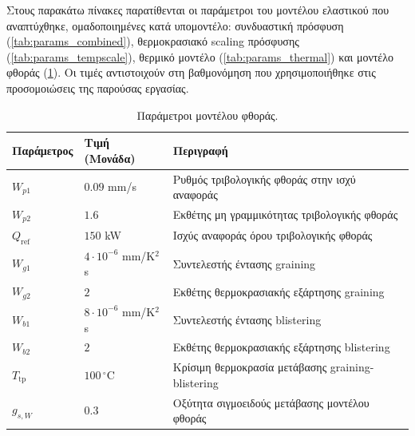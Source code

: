 
Στους παρακάτω πίνακες παρατίθενται οι παράμετροι του μοντέλου ελαστικού που
αναπτύχθηκε, ομαδοποιημένες κατά υπομοντέλο: συνδυαστική πρόσφυση
(\cref{tab:params_combined}), θερμοκρασιακό scaling πρόσφυσης
(\cref{tab:params_tempscale}), θερμικό μοντέλο (\cref{tab:params_thermal}) και
μοντέλο φθοράς (\cref{tab:params_wear}). Οι τιμές αντιστοιχούν στη βαθμονόμηση
που χρησιμοποιήθηκε στις προσομοιώσεις της παρούσας εργασίας.





\begin{table}[htbp]
    \centering
    \small
    \renewcommand{\arraystretch}{1.2}
    \begin{tabular}{@{}l l l@{}}
        \toprule
        \textbf{Παράμετρος} & \textbf{Τιμή (Μονάδα)} & \textbf{Περιγραφή} \\
        \midrule
        $W_{p1}$             & $0.09$ mm/s                 & Ρυθμός τριβολογικής φθοράς στην ισχύ αναφοράς \\
        $W_{p2}$             & $1.6$                       & Εκθέτης μη γραμμικότητας τριβολογικής φθοράς \\
        $Q_{\mathrm{ref}}$   & $150$ kW                    & Ισχύς αναφοράς όρου τριβολογικής φθοράς \\
        $W_{g1}$             & $4 \cdot 10^{-6}$ mm/K$^2$s & Συντελεστής έντασης graining \\
        $W_{g2}$             & $2$                         & Εκθέτης θερμοκρασιακής εξάρτησης graining \\
        $W_{b1}$             & $8 \cdot 10^{-6}$ mm/K$^2$s & Συντελεστής έντασης blistering \\
        $W_{b2}$             & $2$                         & Εκθέτης θερμοκρασιακής εξάρτησης blistering \\
        $T_{\mathrm{tp}}$    & $100\,^\circ\mathrm{C}$     & Κρίσιμη θερμοκρασία μετάβασης graining-blistering \\
        $g_{s,W}$            & $0.3$                       & Οξύτητα σιγμοειδούς μετάβασης μοντέλου φθοράς \\
        \bottomrule
    \end{tabular}
    \caption{Παράμετροι μοντέλου φθοράς.}
    \label{tab:params_wear}
\end{table}
